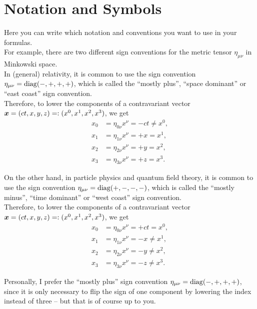 \chapter*{Notation and Symbols}
\thispagestyle{empty}

Here you can write which notation and conventions you want to use in your formulas. \\

\noindent For example, there are two different sign conventions for the metric tensor $\eta_{\mu \nu}$ in Minkowski space. \\

\noindent In (general) relativity, it is common to use the sign convention $\eta_{\mu \nu} = \operatorname{diag}(-,+,+,+)$, which is called the ``mostly plus'', ``space dominant'' or ``east coast'' sign convention. \\
Therefore, to lower the components of a contravariant vector $\boldsymbol{x} = (ct, x, y, z) =: (x^{0}, x^{1}, x^{2}, x^{3})$, we get
\begin{align*}
    x_{0} &= \eta_{0 \nu} x^{\nu} = - ct \neq x^{0}, \\
    x_{1} &= \eta_{1 \nu} x^{\nu} = +x = x^{1}, \\ 
    x_{2} &= \eta_{2 \nu} x^{\nu} = +y = x^{2}, \\
    x_{3} &= \eta_{3 \nu} x^{\nu} = +z = x^{3}.
\end{align*}


\noindent On the other hand, in particle physics and quantum field theory, it is common to use the sign convention $\eta_{\mu \nu} = \operatorname{diag}(+,-,-,-)$, which is called the ``mostly minus'', ``time dominant'' or ``west coast'' sign convention. \\
Therefore, to lower the components of a contravariant vector $\boldsymbol{x} = (ct, x, y, z) =: (x^{0}, x^{1}, x^{2}, x^{3})$, we get
\begin{align*}
    x_{0} &= \eta_{0 \nu} x^{\nu} = +ct = x^{0}, \\
    x_{1} &= \eta_{1 \nu} x^{\nu} = -x \neq x^{1}, \\ 
    x_{2} &= \eta_{2 \nu} x^{\nu} = -y \neq x^{2}, \\
    x_{3} &= \eta_{3 \nu} x^{\nu} = -z \neq x^{3}.
\end{align*}

\noindent Personally, I prefer the ``mostly plus'' sign convention $\eta_{\mu \nu} = \operatorname{diag}(-,+,+,+)$, since it is only necessary to flip the sign of one component by lowering the index instead of three -- but that is of course up to you. \\

